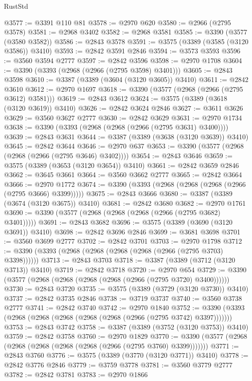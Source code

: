 \begin{lexlean}{RustStd}
\begin{coremodule}
@3577 := @3391 @110 @81
@3578 := @2970 @620
@3580 := @2966 (@2795 @3578)
@3581 := @2968 @3402
@3582 := @2968 @3581
@3585 := @3390 (@3577 (@3580 @3582))
@3586 := @2843 @3578
@3591 := @3575 (@3389 (@3585 (@3120 @3586)) @3410)
@3593 := @2842 @3591 @2846
@3594 := @3573 @3593
@3596 := @3560 @3594 @2777
@3597 := @2842 @3596
@3598 := @2970 @1708
@3604 := @3390 (@3393 (@2968 (@2966 (@2795 @3598) @3401)))
@3605 := @2843 @3598
@3610 := @3387 (@3389 (@3604 (@3120 @3605)) @3410)
@3611 := @2842 @3610
@3612 := @2970 @1697
@3618 := @3390 (@3577 (@2968 (@2966 (@2795 @3612) @3581)))
@3619 := @2843 @3612
@3624 := @3575 (@3389 (@3618 (@3120 @3619)) @3410)
@3626 := @2842 @3624 @2846
@3627 := @3611 @3626
@3629 := @3560 @3627 @2777
@3630 := @2842 @3629
@3631 := @2970 @1734
@3638 := @3390 (@3393 (@2968 (@2968 (@2966 (@2795 @3631) @3400))))
@3639 := @2843 @3631
@3644 := @3387 (@3389 (@3638 (@3120 @3639)) @3410)
@3645 := @2842 @3644
@3646 := @2970 @637
@3653 := @3390 (@3577 (@2968 (@2968 (@2966 (@2795 @3646) @3402))))
@3654 := @2843 @3646
@3659 := @3575 (@3389 (@3653 (@3120 @3654)) @3410)
@3661 := @2842 @3659 @2846
@3662 := @3645 @3661
@3664 := @3560 @3662 @2777
@3665 := @2842 @3664
@3666 := @2970 @1772
@3674 := @3390 (@3393 (@2968 (@2968 (@2968 (@2966 (@2795 @3666) @3399)))))
@3675 := @2843 @3666
@3680 := @3387 (@3389 (@3674 (@3120 @3675)) @3410)
@3681 := @2842 @3680
@3682 := @2970 @1761
@3690 := @3390 (@3577 (@2968 (@2968 (@2968 (@2966 (@2795 @3682) @3401)))))
@3691 := @2843 @3682
@3696 := @3575 (@3389 (@3690 (@3120 @3691)) @3410)
@3698 := @2842 @3696 @2846
@3699 := @3681 @3698
@3701 := @3560 @3699 @2777
@3702 := @2842 @3701
@3703 := @2970 @1798
@3712 := @3390 (@3393 (@2968 (@2968 (@2968 (@2968 (@2966 (@2795 @3703) @3398))))))
@3713 := @2843 @3703
@3718 := @3387 (@3389 (@3712 (@3120 @3713)) @3410)
@3719 := @2842 @3718
@3720 := @2970 @654
@3729 := @3390 (@3577 (@2968 (@2968 (@2968 (@2968 (@2966 (@2795 @3720) @3400))))))
@3730 := @2843 @3720
@3735 := @3575 (@3389 (@3729 (@3120 @3730)) @3410)
@3737 := @2842 @3735 @2846
@3738 := @3719 @3737
@3740 := @3560 @3738 @2777
@3741 := @2842 @3740
@3742 := @2970 @1840
@3752 := @3390 (@3393 (@2968 (@2968 (@2968 (@2968 (@2968 (@2966 (@2795 @3742) @3397)))))))
@3753 := @2843 @3742
@3758 := @3387 (@3389 (@3752 (@3120 @3753)) @3410)
@3759 := @2842 @3758
@3760 := @2970 @1829
@3770 := @3390 (@3577 (@2968 (@2968 (@2968 (@2968 (@2968 (@2966 (@2795 @3760) @3399)))))))
@3771 := @2843 @3760
@3776 := @3575 (@3389 (@3770 (@3120 @3771)) @3410)
@3778 := @2842 @3776 @2846
@3779 := @3759 @3778
@3781 := @3560 @3779 @2777
@3782 := @2842 @3781
@3783 := @2970 @1866

\end{coremodule}
\end{lexlean}
